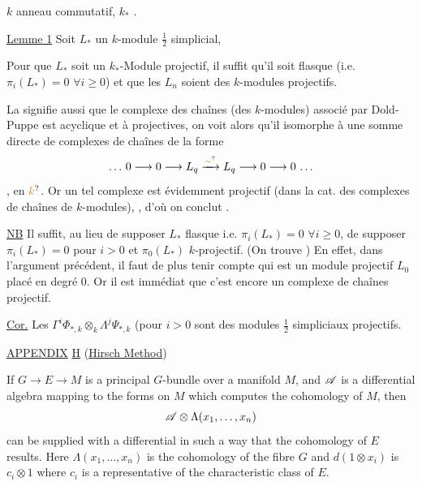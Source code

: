 $k$ anneau commutatif, $k_*$  .

\uline{Lemme 1} Soit $L_*$ un $k$-module $\frac12$ simplicial, 

Pour que $L_*$ soit un $k_*$-Module projectif, il suffit qu'il soit flasque (i.e. $\pi_i(L_*)=0$ $\forall i\geq0$) et que les $L_n$ soient des $k$-modules projectifs.

La  signifie aussi que le complexe des chaînes (des $k$-modules) associé par Dold-Puppe est acyclique et à  projectives, on voit alors qu'il   isomorphe à une somme directe de complexes de chaînes de la forme
\[
\ldots\,0\longrightarrow0\longrightarrow L_q
 \xrightarrow{\unsure{\sim}}L_q\longrightarrow0\longrightarrow0\,\ldots
\]
 , en $\unsure{k}$. Or un tel complexe est évidemment projectif (dans la cat. des complexes de chaînes de $k$-modules), , d'où on conclut .

\uline{NB} Il suffit, au lieu de supposer $L_*$ flasque i.e. $\pi_i(L_*)=0$ $\forall i\geq0$, de supposer $\pi_i(L_*)=0$ pour $i>0$ et $\pi_0(L_*)$ $k$-projectif. (On trouve   ) En effet, dans l'argument précédent, il faut de plus tenir compte  qui est un module projectif $L_0$ placé en degré $0$. Or il est immédiat que c'est encore un complexe de chaînes projectif.

\uline{Cor.} Les $\Gamma^i\Phi_{*,k}\otimes_k\Lambda^j\Psi_{*,k}$  (pour $i>0$ sont des modules $\frac12$ simpliciaux projectifs.

\uline{APPENDIX} \uline{H} (\uline{Hirsch Method})

If $G\to E\to M$ is a principal $G$-bundle over a manifold $M$, and $\mathscr A$ is a differential algebra mapping to the forms on $M$ which computes the cohomology of $M$, then
\[
\mathscr A\otimes\Lambda(x_1,\ldots,x_n)
\]
can be supplied with a differential in such a way that the cohomology of $E$ results. Here $\Lambda(x_1,\ldots,x_n)$ is the cohomology of the fibre $G$ and $d(1\otimes x_i)$ is $c_i\otimes1$ where $c_i$ is a representative of the characteristic class of $E$.

